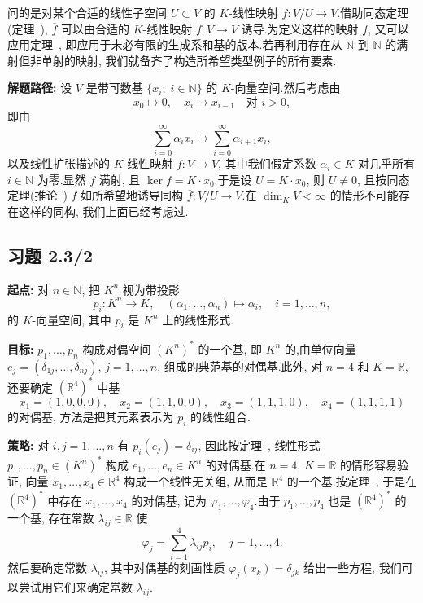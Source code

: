 问的是对某个合适的线性子空间 $U \subset V$ 的 $K$-线性映射 $\overline{f} \colon V/U \longrightarrow V$.借助同态定理(定理~), $\overline{f}$ 可以由合适的 $K$-线性映射 $f \colon V \longrightarrow V$ 诱导.为定义这样的映射 $f$, 又可以应用定理~, 即应用于未必有限的生成系和基的版本.若再利用存在从 $\mathbb{N}$ 到 $\mathbb{N}$ 的满射但非单射的映射, 我们就备齐了构造所希望类型例子的所有要素.

\noindent\textbf{解题路径:} 设 $V$ 是带可数基 $\{x_i;\; i \in \mathbb{N}\}$ 的 $K$-向量空间.然后考虑由
\[
x_0 \longmapsto 0, \quad x_i \longmapsto x_{i - 1} \quad \text{对 } i > 0,
\]
即由
\[
\sum_{i = 0}^{\infty} \alpha_i x_i \longmapsto \sum_{i = 0}^{\infty} \alpha_{i + 1} x_i,
\]
以及线性扩张描述的 $K$-线性映射 $f \colon V \longrightarrow V$, 其中我们假定系数 $\alpha_i \in K$ 对几乎所有 $i \in \mathbb{N}$ 为零.显然 $f$ 满射, 且 $\ker f = K \cdot x_0$.于是设 $U = K \cdot x_0$, 则 $U \neq 0$, 且按同态定理(推论~) $f$ 如所希望地诱导同构 $\overline{f} \colon V/U \longrightarrow V$.在 $\dim_K V < \infty$ 的情形不可能存在这样的同构, 我们上面已经考虑过.

\subsection*{习题 2.3/2}

\noindent\textbf{起点:} 对 $n \in \mathbb{N}$, 把 $K^n$ 视为带投影
\[
p_i \colon K^n \longrightarrow K, \quad (\alpha_1, \ldots, \alpha_n) \longmapsto \alpha_i, \quad i = 1, \ldots, n,
\]
的 $K$-向量空间, 其中 $p_i$ 是 $K^n$ 上的线性形式.

\noindent\textbf{目标:} $p_1, \ldots, p_n$ 构成对偶空间 $(K^n)^*$ 的一个基, 即 $K^n$ 的,由单位向量 $e_j = (\delta_{1j}, \ldots, \delta_{nj})$, $j = 1, \ldots, n$, 组成的典范基的对偶基.此外, 对 $n = 4$ 和 $K = \mathbb{R}$, 还要确定 $(\mathbb{R}^4)^*$ 中基
\[
x_1 = (1, 0, 0, 0), \quad x_2 = (1, 1, 0, 0), \quad x_3 = (1, 1, 1, 0), \quad x_4 = (1, 1, 1, 1)
\]
的对偶基, 方法是把其元素表示为 $p_i$ 的线性组合.

\noindent\textbf{策略:} 对 $i, j = 1, \ldots, n$ 有 $p_i(e_j) = \delta_{ij}$, 因此按定理~, 线性形式 $p_1, \ldots, p_n \in (K^n)^*$ 构成 $e_1, \ldots, e_n \in K^n$ 的对偶基.在 $n = 4$, $K = \mathbb{R}$ 的情形容易验证, 向量 $x_1, \ldots, x_4 \in \mathbb{R}^4$ 构成一个线性无关组, 从而是 $\mathbb{R}^4$ 的一个基.按定理~, 于是在 $(\mathbb{R}^4)^*$ 中存在 $x_1, \ldots, x_4$ 的对偶基, 记为 $\varphi_1, \ldots, \varphi_4$.由于 $p_1, \ldots, p_4$ 也是 $(\mathbb{R}^4)^*$ 的一个基, 存在常数 $\lambda_{ij} \in \mathbb{R}$ 使
\[
\varphi_j = \sum_{i = 1}^{4} \lambda_{ij} p_i, \quad j = 1, \ldots, 4.
\]
然后要确定常数 $\lambda_{ij}$, 其中对偶基的刻画性质 $\varphi_j(x_k) = \delta_{jk}$ 给出一些方程, 我们可以尝试用它们来确定常数 $\lambda_{ij}$.

